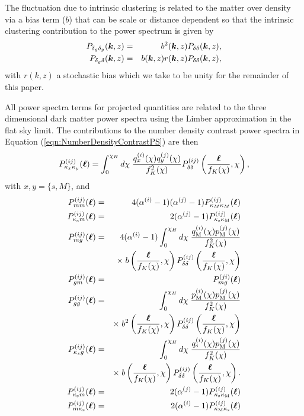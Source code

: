 \documentclass[useAMS,usenatbib,times,letter,amssymb]{mn2e}
\def\be{\begin{equation}}
\def\ee{\end{equation}}
\def\bea{\begin{eqnarray}}
\def\eea{\end{eqnarray}}
\newcommand{\bm}[1]{\mbox{\boldmath{$#1$}}}   %
\begin{document}
The fluctuation due to intrinsic clustering is related to the matter over density via a bias term ($b$) that can be scale or distance dependent so that the intrinsic clustering contribution to the power spectrum is given by
\bea
P_{\delta_g\delta_g}(\bm{k},z) &=& b^2(\bm{k},z)P_{\delta\delta}(\bm{k},z),\\
P_{\delta_g\delta}(\bm{k},z) &=& b(\bm{k},z)r(\bm{k},z)P_{\delta\delta}(\bm{k},z),
\eea
with $r(k,z)$ a stochastic bias which we take to be unity for the remainder of this paper.%

All power spectra terms for projected quantities are related to the three dimensional dark matter power spectra using the Limber approximation in the flat sky limit. The contributions to the number density contrast power spectra in Equation (\ref{eqn:NumberDensityContrastPS}) are then
\be
P^{(ij)}_{\kappa_x\kappa_y}(\bm{\ell}) = \int_0^{\chi_H}d\chi\;\frac{q_x^{(i)}(\chi)q_y^{(j)}(\chi)}{f^2_K(\chi)}P^{(ij)}_{\delta\delta}\left(\frac{\bm{\ell}}{f_K(\chi)},\chi\right),
\ee
with $x,y = \{s,M\}$, and
\bea
P^{(ij)}_{mm}(\bm{\ell}) &=& 4(\alpha^{(i)}-1)(\alpha^{(j)}-1)P^{(ij)}_{\kappa_M\kappa_M}(\bm{\ell})\\
P^{(ij)}_{\kappa_{\rm s} m}(\bm{\ell}) &=& 2(\alpha^{(j)} - 1)P_{\kappa_{\rm s}\kappa_{\rm M}}^{(ij)}(\bm{\ell})\\
P^{(ij)}_{mg}(\bm{\ell}) &=& 4(\alpha^{(i)}-1) \int_0^{\chi_H}d\chi\;\frac{q_{\rm M}^{(i)}(\chi)p_{\rm M}^{(j)}(\chi)}{f^2_K(\chi)}\nonumber\\
&& \times\; b\left(\frac{\bm{\ell}}{f_K(\chi)},\chi\right)P^{(ij)}_{\delta\delta}\left(\frac{\bm{\ell}}{f_K(\chi)},\chi\right)\\
P^{(ij)}_{gm}(\bm{\ell}) &=& P^{(ji)}_{mg}(\bm{\ell}) \\
P^{(ij)}_{gg}(\bm{\ell}) &=& \int_0^{\chi_H}d\chi\;\frac{p_{\rm M}^{(i)}(\chi)p_{\rm M}^{(j)}(\chi)}{f^2_K(\chi)}\nonumber\\
&&\times\;b^2\left(\frac{\bm{\ell}}{f_K(\chi)},\chi\right)P^{(ij)}_{\delta\delta}\left(\frac{\bm{\ell}}{f_K(\chi)},\chi\right)\\
P^{(ij)}_{\kappa_s g}(\bm{\ell}) &=& \int_0^{\chi_H}d\chi\;\frac{q_{\rm s}^{(i)}(\chi)p_{\rm M}^{(j)}(\chi)}{f^2_K(\chi)}\nonumber\\
&&\times\;b\left(\frac{\bm{\ell}}{f_K(\chi)},\chi\right)P^{(ij)}_{\delta\delta}\left(\frac{\bm{\ell}}{f_K(\chi)},\chi\right).\\
P^{(ij)}_{\kappa_{\rm s} m}(\bm{\ell}) &=& 2(\alpha^{(j)}-1)P^{(ij)}_{\kappa_{\rm s} \kappa_{\rm M}}(\bm{\ell})\\
P^{(ij)}_{m \kappa_{\rm s}}(\bm{\ell}) &=& 2(\alpha^{(i)}-1)P^{(ij)}_{\kappa_{\rm M} \kappa_{\rm s}}(\bm{\ell})\\
\eea
\end{document}
